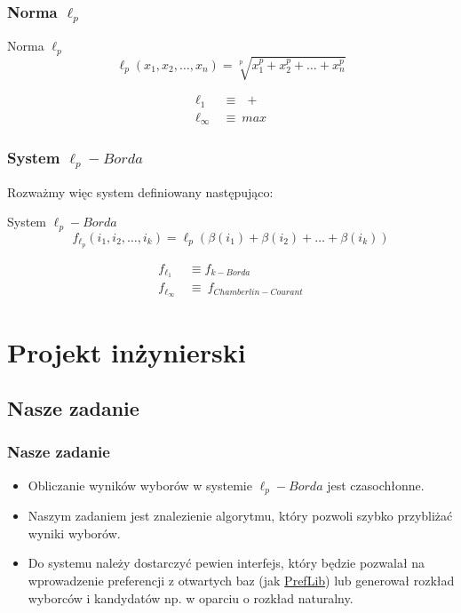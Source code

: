 \documentclass{beamer}
\begin{document}

\begin{frame}
\frametitle{Norma $\ell_p$}

\begin{block}{Norma $\ell_p$}
$$
\ell_p(x_1, x_2, \ldots, x_n ) = \sqrt[p]{ x_1^p + x_2^p + \ldots + x_n^p }
$$
\end{block}

\begin{exampleblock}{}
$$
\begin{aligned}
\ell_1 	\	 &\equiv 	\ \ +  \\
\ell_\infty 	\  &\equiv 	\ max 
\end{aligned}
$$
\end{exampleblock}

\end{frame}


\begin{frame}
\frametitle{System $\ell_p-Borda$}

Rozważmy więc system definiowany następująco:

\begin{exampleblock}{System $\ell_p-Borda$}
$$
f_{\ell_p}(i_1, i_2, \ldots, i_k ) = \ell_p( \beta(i_1) + \beta(i_2) + \ldots + \beta(i_k) )
$$
\end{exampleblock}

\begin{exampleblock}{}
$$
\begin{aligned}
f_{\ell_1} 	\	 &\equiv 	f_{k-Borda}  \\
f_{\ell_\infty} 	\  &\equiv 	\ f_{Chamberlin-Courant} 
\end{aligned}
$$
\end{exampleblock}

\end{frame}

\section{Projekt inżynierski}

\subsection{Nasze zadanie}

\begin{frame}
\frametitle{Nasze zadanie}
\begin{itemize}
\item Obliczanie wyników wyborów w systemie $\ell_p-Borda$ jest czasochłonne.
\item Naszym zadaniem jest znalezienie algorytmu, który pozwoli szybko przybliżać wyniki wyborów.
\item Do systemu należy dostarczyć pewien interfejs, który będzie pozwalał na wprowadzenie preferencji z otwartych baz (jak \href{http://www.preflib.org/}{PrefLib}) lub generował rozkład wyborców i kandydatów np. w oparciu o rozkład naturalny.
\end{itemize}
\end{frame}
\end{document}
